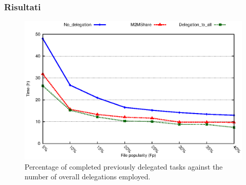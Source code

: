 \documentclass{beamer}
\begin{document}
\begin{frame}
\frametitle{Risultati}
\begin{center}
\begin{figure}[ht]
\includegraphics[scale=0.7]{tempiVFDiversaPop_zoom.eps}
    \caption{Percentage of completed previously delegated tasks against the number of overall delegations employed.}
\end{figure}
\end{center}
\end{frame}
%
%
%
\end{document}
